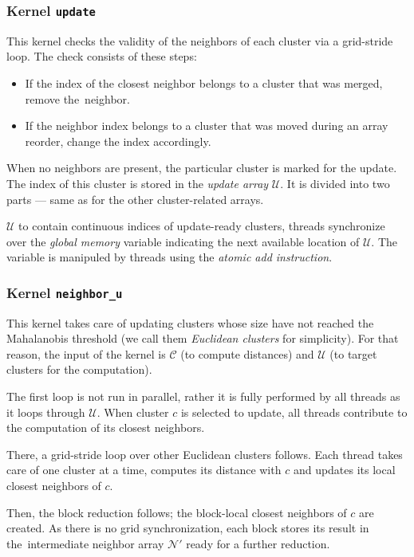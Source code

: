 \subsubsection{Kernel \texttt{update}}
This kernel checks the validity of the neighbors of each cluster via a grid-stride loop. The check consists of these steps:
\begin{itemize}
	\item If the index of the closest neighbor belongs to a cluster that was merged, remove the~neighbor.
	\item If the neighbor index belongs to a cluster that was moved during an array reorder, change the index accordingly.
\end{itemize} 
When no neighbors are present, the particular cluster is marked for the update. The index of this cluster is stored in the \emph{update array} $\mathcal{U}$. It is divided into two parts --- same as for the other cluster-related arrays. 

$\mathcal{U}$ to contain continuous indices of update-ready clusters, threads synchronize over the \emph{global memory} variable indicating the next available location of $\mathcal{U}$. The variable is manipuled by threads using the \emph{atomic add instruction}.

\subsubsection{Kernel \texttt{neighbor\_u}}

This kernel takes care of updating clusters whose size have not reached the Mahalanobis threshold (we call them \emph{Euclidean clusters} for simplicity). For that reason, the input of the kernel is $\mathcal{C}$ (to compute distances) and $\mathcal{U}$ (to target clusters for the computation).

The first loop is not run in parallel, rather it is fully performed by all threads as it loops through $\mathcal{U}$. When cluster $c$ is selected to update, all threads contribute to the computation of its closest neighbors.

There, a grid-stride loop over other Euclidean clusters follows. Each thread takes care of one cluster at a time, computes its distance with $c$ and updates its local closest neighbors of $c$.

Then, the block reduction follows; the block-local closest neighbors of $c$ are created. As there is no grid synchronization, each block stores its result in the~intermediate neighbor array $\mathcal{N}'$ ready for a further reduction.

